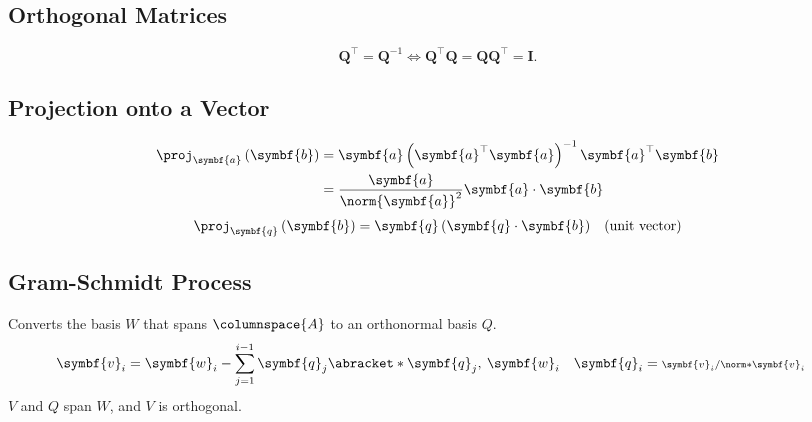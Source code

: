 \documentclass{article}
\begin{document}
\begin{multicols*}{3}
    \subsection{Orthogonal Matrices}
    \begin{equation*}
        \symbf{Q}^\top = \symbf{Q}^{-1}
        \iff
        \symbf{Q}^\top \symbf{Q} = \symbf{Q}\symbf{Q}^\top = \symbf{I}.
    \end{equation*}
    \subsection{Projection onto a Vector}
    \begin{align*}
        \proj_{\symbf{a}} \left( \symbf{b} \right) & = \symbf{a} \left( \symbf{a}^\top \symbf{a} \right)^{-1} \symbf{a}^\top \symbf{b} \\
                                                   & = \frac{\symbf{a}}{\norm{\symbf{a}}^2} \symbf{a} \cdot \symbf{b}
    \end{align*}
    \begin{align*}
        \proj_{\symbf{q}} \left( \symbf{b} \right) = \symbf{q} \left( \symbf{q} \cdot \symbf{b} \right) && \text{(unit vector)} \\
    \end{align*}
    \subsection{Gram-Schmidt Process}
    Converts the basis \(W\) that spans \(\columnspace{A}\) to an
    orthonormal basis \(Q\).
    \begin{align*}
        \symbf{v}_i & = \symbf{w}_i - \sum_{j = 1}^{i - 1} \symbf{q}_j \abracket*{\symbf{q}_j,\: \symbf{w}_i} & \symbf{q}_i & = {\scriptstyle \symbf{v}_i / \norm*{\symbf{v}_i}}
    \end{align*}
    \(V\) and \(Q\) span \(W\), and \(V\) is orthogonal.

\end{multicols*}
\end{document}
